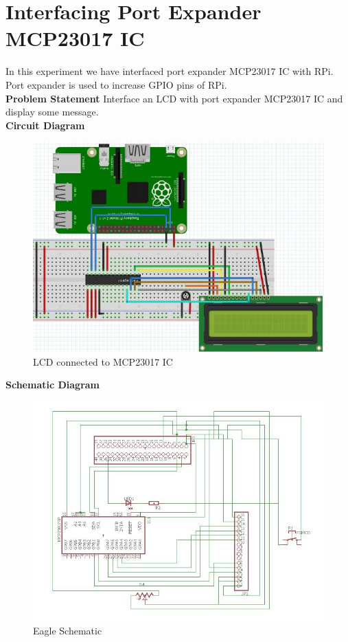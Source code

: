 \documentclass[a4paper,12pt,oneside]{book}
\begin{document}
\section{Interfacing Port Expander MCP23017 IC}
In this experiment we have interfaced port expander MCP23017 IC with RPi. Port expander is used to increase GPIO pins of RPi.  \\
\textbf{Problem Statement}
Interface an LCD with port expander MCP23017 IC and display some message.\\
\textbf{Circuit Diagram}\\
\begin{figure}[H]
    \centering
    \includegraphics[scale=0.4]{port_expander_lcd}
    \caption{LCD connected to MCP23017 IC}
\end{figure}
\newpage
\textbf{Schematic Diagram}\\
\begin{figure}[H]
    \centering
    \includegraphics[scale= 0.8]{LCD_schematic}
    \caption{Eagle Schematic}
\end{figure}
\end{document}

